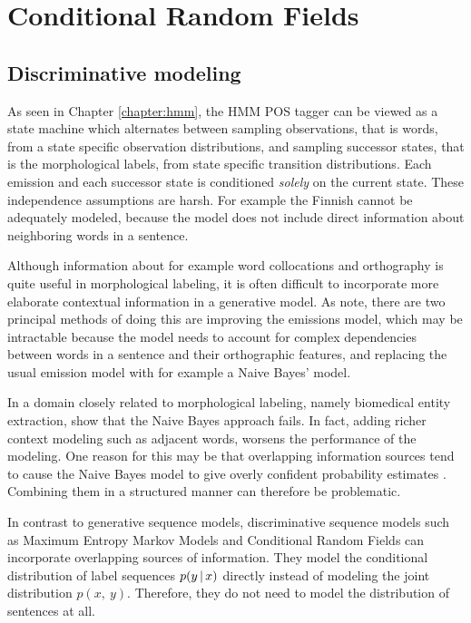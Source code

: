 \chapter{Conditional Random Fields}

\section{Discriminative modeling}

As seen in Chapter \ref{chapter:hmm}, the HMM POS tagger can be viewed
as a state machine which alternates between sampling observations,
that is words, from a state specific observation distributions, and
sampling successor states, that is the morphological labels, from
state specific transition distributions. Each emission and each
successor state is conditioned {\it solely} on the current
state. These independence assumptions are harsh. For example the
Finnish  cannot be adequately modeled, because the model does not
include direct information about neighboring words in a sentence.

Although information about for example word collocations and
orthography is quite useful in morphological labeling, it is often
difficult to incorporate more elaborate contextual information in a
generative model. As \cite{Sutton2012} note, there are two principal
methods of doing this are improving the emissions model, which may be
intractable because the model needs to account for complex
dependencies between words in a sentence and their orthographic
features, and replacing the usual emission model with for example a
Naive Bayes' model.

In a domain closely related to morphological labeling, namely
biomedical entity extraction,\cite{Ruokolainen2013} show that the
Naive Bayes approach fails. In fact, adding richer context modeling
such as adjacent words, worsens the performance of the modeling. One
reason for this may be that overlapping information sources tend to
cause the Naive Bayes model to give overly confident probability
estimates \citep{Sutton2012}. Combining them in a structured manner
can therefore be problematic.

In contrast to generative sequence models, discriminative sequence
models such as Maximum Entropy Markov Models \citep{Ratnaparkhi1998}
and Conditional Random Fields \citep{Lafferty2001} can incorporate
overlapping sources of information. They model the conditional
distribution of label sequences $p(y\mbox{$ \, | \, $} x)$ directly instead of
modeling the joint distribution $p(x,\ y)$. Therefore, they do not
need to model the distribution of sentences at all. 

